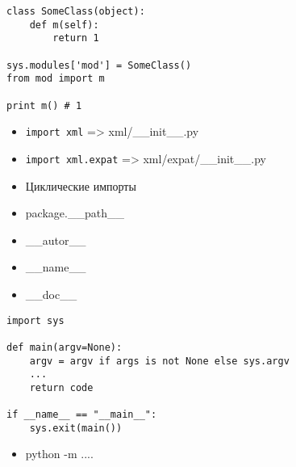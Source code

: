 \documentclass{article}
\begin{document}
{
\LARGE \vspace{15pt}
\begin{lstlisting}
class SomeClass(object):
	def m(self):
		return 1

sys.modules['mod'] = SomeClass()
from mod import m

print m() # 1
\end{lstlisting}
}

\newpage

\begin{itemize}
	\item \lstinline!import xml! => xml/\_\_init\_\_.py
	\item \lstinline!import xml.expat! => xml/expat/\_\_init\_\_.py
	\item Циклические импорты
	\item package.\_\_path\_\_
\end{itemize}
\newpage

\center{}
\begin{itemize}
	\item \_\_autor\_\_
	\item \_\_name\_\_
	\item \_\_doc\_\_
\end{itemize}

{
\LARGE \vspace{15pt}
\begin{lstlisting}
import sys

def main(argv=None):
	argv = argv if args is not None else sys.argv
	...
	return code

if __name__ == "__main__":
	sys.exit(main())

\end{lstlisting}
}

\newpage

\center{}
\begin{itemize}
	\item python -m ....
\end{itemize}
\newpage

\end{document}
